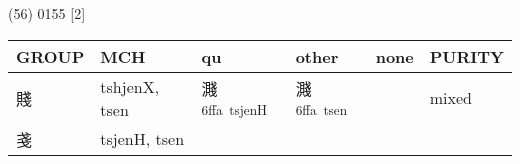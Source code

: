 \documentclass[14pt,a4paper]{scrartcl}
\begin{document}
(56) 0155 {[}2{]}

\begin{longtable}[c]{@{}llllll@{}}
\toprule
\begin{minipage}[b]{0.14\columnwidth}\raggedright\strut
GROUP
\strut\end{minipage} &
\begin{minipage}[b]{0.14\columnwidth}\raggedright\strut
MCH
\strut\end{minipage} &
\begin{minipage}[b]{0.14\columnwidth}\raggedright\strut
qu
\strut\end{minipage} &
\begin{minipage}[b]{0.14\columnwidth}\raggedright\strut
other
\strut\end{minipage} &
\begin{minipage}[b]{0.14\columnwidth}\raggedright\strut
none
\strut\end{minipage} &
\begin{minipage}[b]{0.14\columnwidth}\raggedright\strut
PURITY
\strut\end{minipage}\tabularnewline
\midrule
\endhead
\begin{minipage}[t]{0.14\columnwidth}\raggedright\strut
賤
\strut\end{minipage} &
\begin{minipage}[t]{0.14\columnwidth}\raggedright\strut
tshjenX, tsen
\strut\end{minipage} &
\begin{minipage}[t]{0.14\columnwidth}\raggedright\strut
濺\textsuperscript{6ffa~tsjenH}
\strut\end{minipage} &
\begin{minipage}[t]{0.14\columnwidth}\raggedright\strut
濺\textsuperscript{6ffa~tsen}
\strut\end{minipage} &
\begin{minipage}[t]{0.14\columnwidth}\raggedright\strut
\strut\end{minipage} &
\begin{minipage}[t]{0.14\columnwidth}\raggedright\strut
mixed
\strut\end{minipage}\tabularnewline
\begin{minipage}[t]{0.14\columnwidth}\raggedright\strut
戔
\strut\end{minipage} &
\begin{minipage}[t]{0.14\columnwidth}\raggedright\strut
tsjenH, tsen
\strut\end{minipage} &
\begin{minipage}[t]{0.14\columnwidth}\raggedright\strut

\end{minipage}
\end{longtable}
\end{document}
